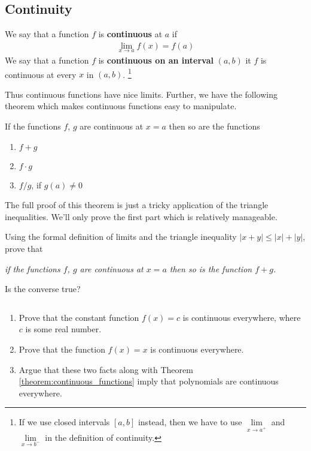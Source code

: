 \subsection{Continuity}

\begin{definition}
  We say that a function $f$ is {\bf continuous} at $a$ if
  \begin{align*}
    \lim \limits_{x \rightarrow a} f(x) = f(a)
  \end{align*}
  We say that a function $f$ is {\bf continuous on an interval} $(a,b)$ it $f$ is continuous at every $x$ in $(a,b)$. \footnote{If we use closed intervals $[a,b]$ instead, then we have to use $\lim \limits_{x \rightarrow a^+}$ and $\lim \limits_{x \rightarrow b^-}$ in the definition of continuity.}
\end{definition}

Thus continuous functions have {nice} limits. Further, we have the following theorem which makes continuous functions easy to manipulate.

\begin{theorem}
  \label{theorem:continuous_functions}
  If the functions $f$, $g$ are continuous at $x=a$ then so are the functions
  \begin{enumerate}
    \item $ f + g$
    \item $f \cdot g$
    \item $f / g$, if $g(a) \neq 0$
  \end{enumerate}
\end{theorem}

\noindent The full proof of this theorem is just a tricky application of the triangle inequalities. We'll only prove the first part which is relatively manageable.


\begin{exercise}
  \label{q:for_later_1}
  Using the formal definition of limits and the triangle inequality $|x+y| \le |x| + |y|$, prove that
  \begin{indentPara}
    {\it if the functions $f$, $g$ are continuous at $x=a$ then so is the function $f + g$.}
  \end{indentPara}
  Is the converse true?
\end{exercise}

\begin{exercise}$ $
  \label{q:for_later_2}
  \begin{enumerate}
    \item Prove that the constant function $f(x) = c$ is continuous everywhere, where $c$ is some real number.
    \item  Prove that the function $f(x) = x$ is continuous everywhere.
    \item Argue that these two facts along with Theorem \ref{theorem:continuous_functions} imply that polynomials are continuous everywhere.
  \end{enumerate}
\end{exercise}

